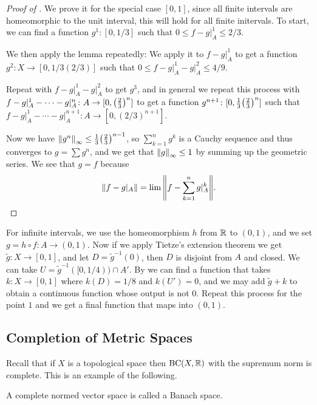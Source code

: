 \begin{proof}[Proof of ]
    We prove it for the special case $[0, 1]$, since all finite intervals are homeomorphic to the unit interval, this will hold for all finite initervals. To start, we can find a function $g^1 \colon [0, 1/3]$ such that $0 \le f - g\vert_A^1 \le 2/3$.

    We then apply the lemma repeatedly: We apply it to $f - g\vert_A^1$ to get a function $g^2\colon X \to [0, 1/3(2/3)]$ such that $0 \le f - g\vert_A^1 - g\vert_A^2 \le 4/9$.

    Repeat with $f - g\vert_A^1 - g\vert_A^2$ to get $g^3$, and in general we repeat this process with $f - g\vert_A^1 - \cdots - g\vert_A^n\colon A \to [0, \qty(\frac 23)^n]$ to get a function $g^{n + 1} \colon [0, \frac{1}{3}\qty(\frac{2}{3})^n]$ such that $f - g\vert_A^1 - \cdots - g\vert_A^{n + 1}\colon A \to [0, (2/3)^{n + 1}]$.

    Now we have $\norm{g^n}_\infty \le \frac{1}{3}\qty(\frac{2}{3})^{n - 1}$, so $\sum_{k = 1}^{n} g^k$ is a Cauchy sequence and thus converges to $g = \sum g^n$, and we get that $\norm{g}_\infty \le 1$ by summing up the geometric series. We see that $g = f$ because \[\norm{f - g\vert_A} = \lim \norm{f - \sum_{k = 1}^n g\vert_A^k}.\]
\end{proof}

For infinite intervals, we use the homeomorphism $h$ from $\mathbb R$ to $(0, 1)$, and we set $g = h \circ f \colon A \to (0, 1)$. Now if we apply Tietze's extension theorem we get $\tilde g \colon X \to [0, 1]$, and let $D = \tilde g^{-1}(0)$, then $D$ is disjoint from $A$ and closed. We can take $U = \tilde g^{-1}([0, 1/4)) \cap A'$. By  we can find a function that takes $k \colon X \to [0, 1]$ where $k(D) = 1/8$ and $k(U') = 0$, and we may add $\tilde g + k$ to obtain a continuous function whose output is not $0$. Repeat this process for the point $1$ and we get a final function that maps into $(0, 1)$.

\subsection{Completion of Metric Spaces}


Recall that if $X$ is a topological space then $\mathrm{BC}(X, \mathbb R)$ with the supremum norm is complete. This is an example of the following.

\begin{definition}
    A complete normed vector space is called a Banach space.
\end{definition}

